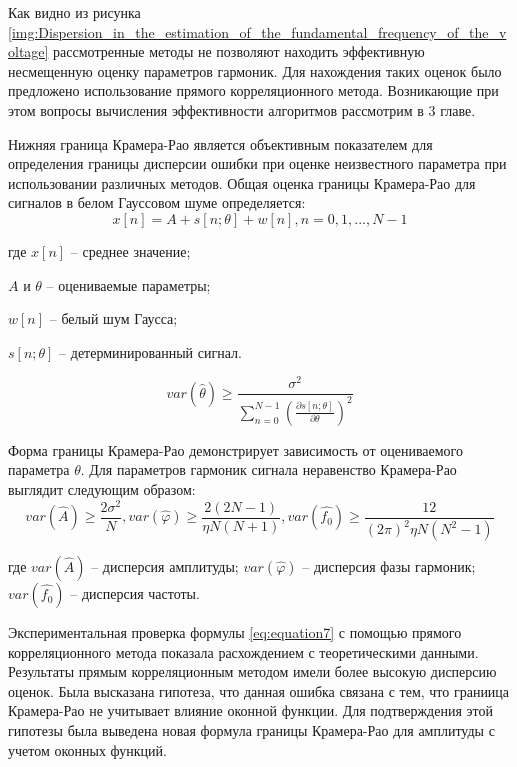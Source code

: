 Как видно из рисунка	\ref{img:Dispersion_in_the_estimation_of_the_fundamental_frequency_of_the_voltage} рассмотренные методы не позволяют находить эффективную несмещенную оценку параметров гармоник. Для нахождения таких оценок было предложено использование прямого корреляционного метода. Возникающие при этом вопросы вычисления эффективности алгоритмов рассмотрим в 3 главе.

Нижняя граница Крамера-Рао является объективным показателем для
определения границы дисперсии ошибки при оценке неизвестного параметра при
использовании различных методов. Общая оценка границы Крамера-Рао для сигналов в белом Гауссовом шуме определяется:
\begin{equation}
	\label{eq:equation5}
	x[n] = A + s[n;\theta] + w[n], n=0,1,...,N-1	
\end{equation}

где $x[n]$ -- среднее значение;

$A$ и $\theta$  -- оцениваемые параметры;

$w[n]$ -- белый шум Гаусса;

$s[n;\theta]$ -- детерминированный сигнал.

\begin{equation}
	\label{eq:equation6}
	var(\hat{\theta}) \geq \frac{\sigma^2}{\displaystyle\sum_{n=0}^{N-1} \left(\frac{\partial s [n; \theta]}{\partial\theta}\right)^2} 
\end{equation}

Форма границы Крамера-Рао демонстрирует зависимость от оцениваемого параметра $\theta$.
Для параметров гармоник сигнала неравенство Крамера-Рао выглядит следующим образом:
\begin{equation}
\label{eq:equation7}
var(\hat{A})\geq \frac{2  \sigma^2}{N}, var(\hat{\varphi})\geq \frac{2(2N-1)}{\eta N(N+1)}, var(\hat{f_0})\geq \frac{12}{(2\pi)^2 \eta  N(N^2 - 1)}    
\end{equation}

где $var(\hat{A})$ -- дисперсия амплитуды;
$var(\hat{\varphi})$ -- дисперсия фазы гармоник; 
$var(\hat{f_0})$ -- дисперсия частоты.


Экспериментальная проверка формулы 	\ref{eq:equation7} с помощью прямого корреляционного метода показала расхождением с теоретическими данными. Результаты прямым корреляционным методом имели более высокую дисперсию оценок. Была высказана гипотеза, что данная ошибка связана с тем, что граниица Крамера-Рао не учитывает влияние оконной функции. Для подтверждения этой гипотезы была выведена новая формула границы Крамера-Рао для амплитуды с учетом оконных функций.
 
